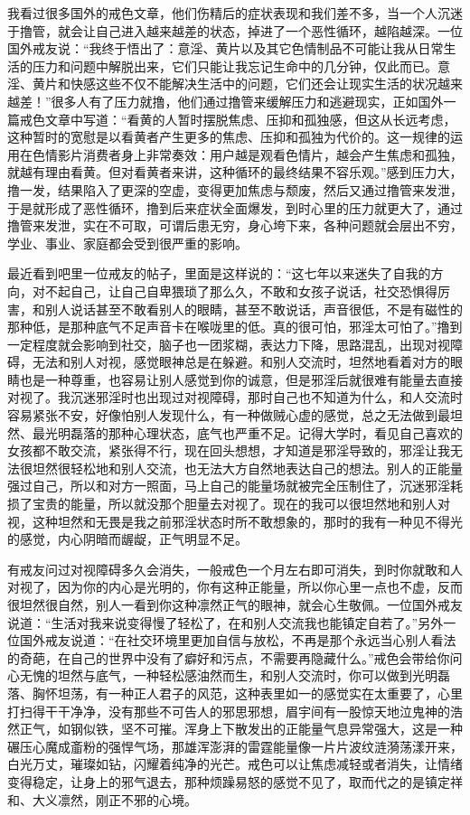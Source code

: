 我看过很多国外的戒色文章，他们伤精后的症状表现和我们差不多，当一个人沉迷于撸管，就会让自己进入越来越差的状态，掉进了一个恶性循环，越陷越深。一位国外戒友说：“我终于悟出了：意淫、黄片以及其它色情制品不可能让我从日常生活的压力和问题中解脱出来，它们只能让我忘记生命中的几分钟，仅此而已。意淫、黄片和快感这些不仅不能解决生活中的问题，它们还会让现实生活的状况越来越差！”很多人有了压力就撸，他们通过撸管来缓解压力和逃避现实，正如国外一篇戒色文章中写道：“看黄的人暂时摆脱焦虑、压抑和孤独感，但这从长远考虑，这种暂时的宽慰是以看黄者产生更多的焦虑、压抑和孤独为代价的。这一规律的运用在色情影片消费者身上非常奏效：用户越是观看色情片，越会产生焦虑和孤独，就越有理由看黄。但对看黄者来讲，这种循环的最终结果不容乐观。”感到压力大，撸一发，结果陷入了更深的空虚，变得更加焦虑与颓废，然后又通过撸管来发泄，于是就形成了恶性循环，撸到后来症状全面爆发，到时心里的压力就更大了，通过撸管来发泄，实在不可取，可谓后患无穷，身心垮下来，各种问题就会层出不穷，学业、事业、家庭都会受到很严重的影响。

最近看到吧里一位戒友的帖子，里面是这样说的：“这七年以来迷失了自我的方向，对不起自己，让自己自卑猥琐了那么久，不敢和女孩子说话，社交恐惧得厉害，和别人说话甚至不敢看别人的眼睛，甚至不敢说话，声音很低，不是有磁性的那种低，是那种底气不足声音卡在喉咙里的低。真的很可怕，邪淫太可怕了。”撸到一定程度就会影响到社交，脑子也一团浆糊，表达力下降，思路混乱，出现对视障碍，无法和别人对视，感觉眼神总是在躲避。和别人交流时，坦然地看着对方的眼睛也是一种尊重，也容易让别人感觉到你的诚意，但是邪淫后就很难有能量去直接对视了。我沉迷邪淫时也出现过对视障碍，那时自己也不知道为什么，和人交流时容易紧张不安，好像怕别人发现什么，有一种做贼心虚的感觉，总之无法做到最坦然、最光明磊落的那种心理状态，底气也严重不足。记得大学时，看见自己喜欢的女孩都不敢交流，紧张得不行，现在回头想想，才知道是邪淫导致的，邪淫让我无法很坦然很轻松地和别人交流，也无法大方自然地表达自己的想法。别人的正能量强过自己，所以和对方一照面，马上自己的能量场就被完全压制住了，沉迷邪淫耗损了宝贵的能量，所以就没那个胆量去对视了。现在的我可以很坦然地和别人对视，这种坦然和无畏是我之前邪淫状态时所不敢想象的，那时的我有一种见不得光的感觉，内心阴暗而龌龊，正气明显不足。

有戒友问过对视障碍多久会消失，一般戒色一个月左右即可消失，到时你就敢和人对视了，因为你的内心是光明的，你有这种正能量，所以你心里一点也不虚，反而很坦然很自然，别人一看到你这种凛然正气的眼神，就会心生敬佩。一位国外戒友说道：“生活对我来说变得慢了轻松了，在和别人交流我也能镇定自若了。”另外一位国外戒友说道：“在社交环境里更加自信与放松，不再是那个永远当心别人看法的奇葩，在自己的世界中没有了癖好和污点，不需要再隐藏什么。”戒色会带给你问心无愧的坦然与底气，一种轻松感油然而生，和别人交流时，你可以做到光明磊落、胸怀坦荡，有一种正人君子的风范，这种表里如一的感觉实在太重要了，心里打扫得干干净净，没有那些不可告人的邪思邪想，眉宇间有一股惊天地泣鬼神的浩然正气，如钢似铁，坚不可摧。浑身上下散发出的正能量气息异常强大，这是一种碾压心魔成齑粉的强悍气场，那雄浑澎湃的雷霆能量像一片片波纹涟漪荡漾开来，白光万丈，璀璨如钻，闪耀着纯净的光芒。戒色可以让焦虑减轻或者消失，让情绪变得稳定，让身上的邪气退去，那种烦躁易怒的感觉不见了，取而代之的是镇定祥和、大义凛然，刚正不邪的心境。

